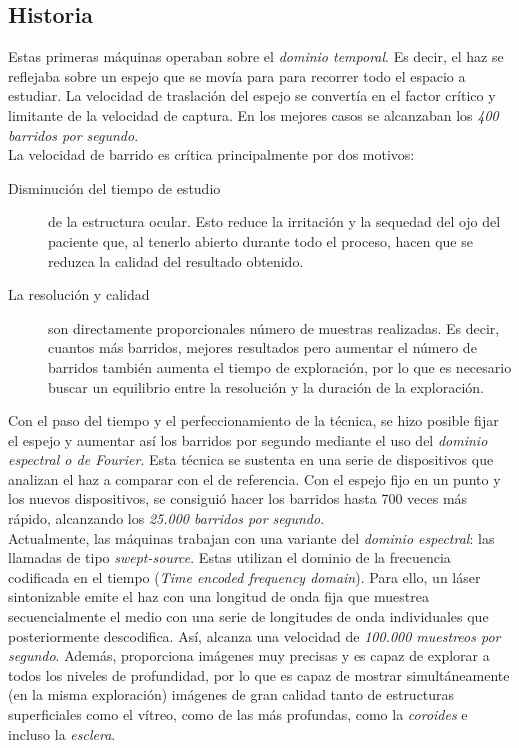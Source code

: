 \subsection{Historia}
Estas primeras máquinas operaban sobre el \emph{dominio temporal}. Es
decir, el haz se reflejaba sobre un espejo que se movía para para
recorrer todo el espacio a estudiar. La velocidad de traslación del
espejo se convertía en el factor crítico y limitante de la velocidad
de
captura. En los mejores casos se alcanzaban los \emph{400 barridos por segundo}.\\
La velocidad de barrido es crítica principalmente por dos motivos:
\begin{description}
\item [Disminución del tiempo de estudio] de la estructura
  ocular. Esto reduce la irritación y la sequedad del ojo del paciente
  que, al tenerlo abierto durante todo el proceso, hacen que se
  reduzca la calidad del resultado obtenido.
\item [La resolución y calidad] son directamente proporcionales número
  de muestras realizadas. Es decir, cuantos más barridos, mejores
  resultados pero aumentar el número de barridos también aumenta el
  tiempo de exploración, por lo que es necesario buscar un equilibrio
  entre la resolución y la duración de la exploración.
\end{description}
Con el paso del tiempo y el perfeccionamiento de la técnica, se hizo
posible fijar el espejo y aumentar así los barridos por segundo
mediante el uso del \emph{dominio espectral o de Fourier}. Esta
técnica se sustenta en una serie de dispositivos que analizan el haz a
comparar con el de referencia. Con el espejo fijo en un punto y los
nuevos dispositivos, se consiguió hacer los barridos hasta 700 veces
más rápido, alcanzando los \emph{25.000 barridos por segundo}.\\
Actualmente, las máquinas trabajan con una variante del \emph{dominio
  espectral}: las llamadas de tipo \emph{swept-source}. Estas utilizan
el dominio de la frecuencia codificada en el tiempo (\emph{Time
  encoded frequency domain}). Para ello, un láser sintonizable emite
el haz con una longitud de onda fija que muestrea secuencialmente el
medio con una serie de longitudes de onda individuales que
posteriormente descodifica. Así, alcanza una velocidad de
\emph{100.000 muestreos por segundo}. Además, proporciona imágenes muy
precisas y es capaz de explorar a todos los niveles de profundidad,
por lo que es capaz de mostrar simultáneamente (en la misma
exploración) imágenes de gran calidad tanto de estructuras
superficiales como el vítreo, como de las más profundas, como la
\emph{\gls{coroides}} e incluso la \emph{\gls{esclera}}.

